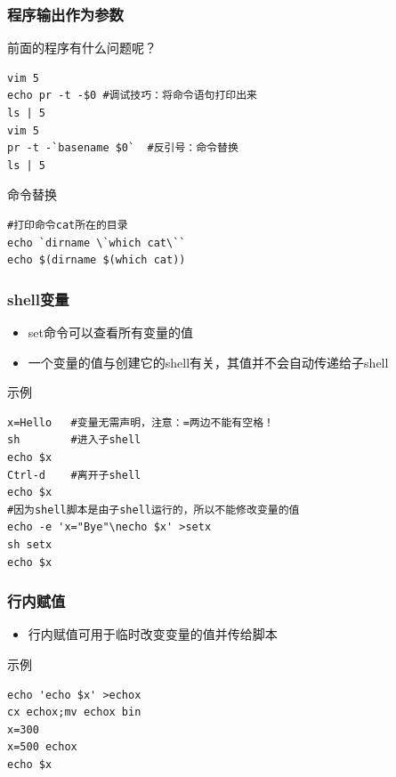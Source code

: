 \documentclass[xcolor=svgnames,presentation]{beamer}
\begin{document}
\begin{frame}[fragile]
\frametitle{程序输出作为参数}
\label{sec-1-1-10}
\begin{exampleblock}{前面的程序有什么问题呢？}
\label{sec-1-1-10-1}


\begin{verbatim}
vim 5
echo pr -t -$0 #调试技巧：将命令语句打印出来
ls | 5
vim 5
pr -t -`basename $0`  #反引号：命令替换
ls | 5
\end{verbatim}
\end{exampleblock}
\begin{block}{命令替换}
\label{sec-1-1-10-2}


\begin{verbatim}
#打印命令cat所在的目录
echo `dirname \`which cat\``
echo $(dirname $(which cat))
\end{verbatim}
\end{block}
\end{frame}
\begin{frame}[fragile]
\frametitle{shell变量}
\label{sec-1-1-11}
\begin{itemize}

\item set命令可以查看所有变量的值
\label{sec-1-1-11-1}%

\item 一个变量的值与创建它的shell有关，其值并不会自动传递给子shell
\label{sec-1-1-11-2}%
\end{itemize} %
\begin{exampleblock}{示例}
\label{sec-1-1-11-3}


\begin{verbatim}
x=Hello   #变量无需声明，注意：=两边不能有空格！
sh        #进入子shell
echo $x
Ctrl-d    #离开子shell
echo $x
#因为shell脚本是由子shell运行的，所以不能修改变量的值
echo -e 'x="Bye"\necho $x' >setx
sh setx
echo $x
\end{verbatim}
\end{exampleblock}
\end{frame}
\begin{frame}[fragile]
\frametitle{行内赋值}
\label{sec-1-1-12}
\begin{itemize}

\item 行内赋值可用于临时改变变量的值并传给脚本
\label{sec-1-1-12-1}%
\end{itemize} %
\begin{exampleblock}{示例}
\label{sec-1-1-12-2}


\begin{verbatim}
echo 'echo $x' >echox
cx echox;mv echox bin
x=300
x=500 echox
echo $x
\end{verbatim}
\end{exampleblock}
\end{frame}
\end{document}
